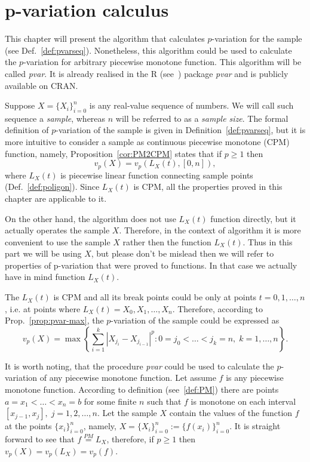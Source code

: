 \documentclass[12pt, a4paper]{article}
\numberwithin{equation}{section}
\begin{document}
\section{p-variation calculus}  
  
This chapter will present the algorithm that calculates 
$p$-variation for the sample 
(see Def.~\ref{def:pvarseq}).
Nonetheless, this algorithm could be used to calculate
the $p$-variation for arbitrary piecewise monotone function. 
This algorithm will be called \emph{pvar}. 
It is already realised in the R (see~\cite{R}) package \emph{pvar} and
is publicly available on CRAN\footnotemark.

Suppose $X=\{X_{i}\}_{i=0}^{n}$ is any real-value sequence of numbers. 
We will call such sequence a \emph{sample}, 
whereas $n$ will be referred to as a \emph{sample size}.
The formal definition of $p$-variation 
of the sample is given in Definition~\ref{def:pvarseq}, but 
it is more intuitive to consider a sample as 
continuous piecewise monotone (CPM) function, namely,
Proposition~\ref{cor:PM2CPM} states that if $p\geq1$ then
\begin{equation}
  v_p(X) = v_p(L_X(t),[0,n]),
\end{equation}
where $L_X(t)$ is piecewise linear function 
connecting sample points (Def.~\ref{def:poligon}).
Since $L_X(t)$ is CPM, all the properties proved in this chapter are
applicable to it.

On the other hand, the algorithm does not use
$L_X(t)$ function directly, but it actually operates the
sample $X$. Therefore, in the context of algorithm
it is more convenient to use the sample $X$ rather then the function $L_X(t)$. Thus in this part we will be using $X$, but please don't be mislead then we will refer to properties of p-variation 
that were proved to functions. In that case we actually have in mind function $L_X(t)$. 

The $L_X(t)$ is CPM and all its break points could be 
only at points $t=0,1,\dots,n$, i.e. at points where 
 $L_X(t)=X_0,X_1,\dots,X_n$.
Therefore, according to Prop.~\ref{prop:pvar-max},
 the $p$-variation of the sample could be expressed as
\begin{equation}
v_p(X) = \max\left\{ \sum_{i=1}^k |X_{j_i} - X_{j_{i-1}}|^p :
  0=j_0<\dots<j_k=n,\; k=1,\dots,n  \right\}.
\end{equation}


It is worth noting, 
that the procedure \emph{pvar} could be used to calculate
the $p$-variation of any piecewise monotone function.
Let assume $f$ is any piecewise monotone function.  
According to definition (see~\ref{def:PM}) 
there are points $a=x_1<\dots<x_n=b$ for some finite $n$ such 
that $f$ is monotone on each interval $[x_{j-1},x_j],\;j=1,2,\dots,n$.
Let the sample $X$ contain the values of the function $f$ 
at the points $\{x_{i}\}_{i=0}^{n}$, namely,
$X=\{X_{i}\}_{i=0}^{n}:=\{f(x_{i})\}_{i=0}^{n}$.
It is straight forward to see that 
$f \stackrel{PM}{=} L_X$, therefore, if $p \geq 1$ then $v_p(X)=v_p(L_X)=v_p(f)$.
\end{document}
